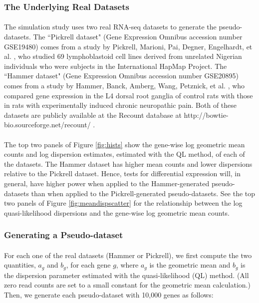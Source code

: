 \documentclass[10pt]{article}
\begin{document}
\subsubsection*{The Underlying Real Datasets} \label{sec:thisdata}

\paragraph{} \indent The simulation study uses two real RNA-seq datasets to generate the pseudo-datasets. The ``Pickrell dataset" (Gene Expression Omnibus accession number GSE19480) comes from a study by Pickrell, Marioni, Pai, Degner, Engelhardt, et al. \cite{pickrell}, who studied 69 lymphoblastoid cell lines derived from unrelated Nigerian individuals who were subjects in the International HapMap Project. The ``Hammer dataset" (Gene Expression Omnibus accession number GSE20895) comes from a study by Hammer, Banck, Amberg, Wang, Petznick, et al. \cite{hammer}, who compared gene expression in the L4 dorsal root ganglia of control rats with those in rats with experimentally induced chronic neuropathic pain. Both of these datasets are publicly available at the Recount database at {http://bowtie-bio.sourceforge.net/recount/} \cite{recount}.

\paragraph{} \indent The top two panels of Figure \ref{fig:hists} show the gene-wise log geometric mean counts and log dispersion estimates, estimated with the QL method, of each of the datasets. The Hammer dataset has higher mean counts and lower dispersions relative to the Pickrell dataset. Hence, tests for differential expression will, in general, have higher power when applied to the Hammer-generated pseudo-datasets than when applied to the Pickrell-generated pseudo-datasets. See the top two panels of Figure \ref{fig:meandispscatter} for the relationship between the log quasi-likelihood dispersions and the gene-wise log geometric mean counts.

\subsubsection*{Generating a Pseudo-dataset}

\paragraph{} \indent For each one of the real datasets (Hammer or Pickrell), we first compute the two quantities, $a_g$ and $b_g$, for each gene $g$, where $a_g$ is the geometric mean and $b_g$ is the dispersion parameter estimated with the quasi-likelihood (QL) method. (All zero read counts are set to a small constant for the geometric mean calculation.) Then, we generate each pseudo-dataset with 10,000 %
genes as follows:
\end{document}
